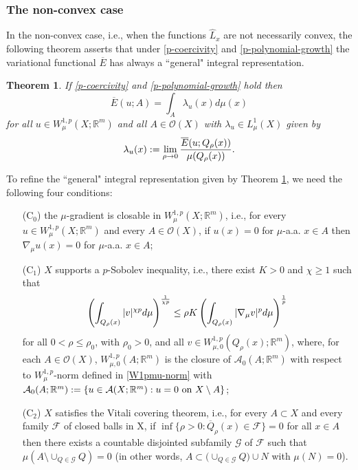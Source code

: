\documentclass[10pt]{amsart}
\numberwithin{equation}{section}
\newtheorem{theorem}{Theorem}[section]
\theoremstyle{definition}
\theoremstyle{remark}
\begin{document}
\subsubsection{The non-convex case} In the non-convex case, i.e., when the functions $\widehat{L}_x$ are not necessarily convex, the following theorem asserts that under \eqref{p-coercivity} and \eqref{p-polynomial-growth} the variational functional $\overline{E}$ has always a ``general" integral representation.

\begin{theorem}\label{N-C-IRT}
If \eqref{p-coercivity} and \eqref{p-polynomial-growth} hold then  
$$
\overline{E}(u;A)=\int_A \lambda_u(x)d\mu(x)
$$
for all $u\in W^{1,p}_\mu(X;{{\mathbb R}}^m)$ and all $A\in\mathcal{O}(X)$ with $\lambda_u\in L^1_\mu(X)$ given by 
$$
\lambda_u(x):=\lim_{\rho\to0}{\overline{E}(u;Q_\rho(x))\over\mu(Q_\rho(x))}.
$$ 
\end{theorem}

To refine the ``general" integral representation given by Theorem \ref{N-C-IRT}, we need the following four conditions:
\begin{itemize}
\item[(C$_0$)] the $\mu$-gradient is closable in $W^{1,p}_\mu(X;{{\mathbb R}}^m)$, i.e., for every $u\in W^{1,p}_\mu(X;{{\mathbb R}}^m)$ and every $A\in\mathcal{O}(X)$, if $u(x)=0$ for $\mu$-a.a. $x\in A$ then $\nabla_\mu u(x)=0$ for $\mu$-a.a. $x\in A$;
\item[(C$_1$)] $X$ supports a $p$-Sobolev inequality, i.e., there exist $K>0$ and $\chi\geq 1$ such that
\begin{equation}\label{Poincare-Inequality}
\left(\int_{Q_\rho(x)}|v|^{\chi p}d\mu\right)^{1\over\chi p}\leq \rho K\left(\int_{Q_\rho(x)}|\nabla_\mu v|^pd\mu\right)^{1\over p}
\end{equation}
for all $0<\rho\leq \rho_0$, with $\rho_0>0$, and all $v\in W^{1,p}_{\mu,0}(Q_\rho(x);{{\mathbb R}}^m)$, where, for each $A\in\mathcal{O}(X)$, $W^{1,p}_{\mu,0}(A;{{\mathbb R}}^m)$ is the closure of $\mathcal{A}_0(A;{{\mathbb R}}^m)$ with respect to $W^{1,p}_\mu$-norm defined in \eqref{W1pmu-norm} with $\mathcal{A}_0(A;{{\mathbb R}}^m):=\{u\in\mathcal{A}(X;{{\mathbb R}}^m):u=0\hbox{ on }X\setminus A\}$;
\item[(C$_2$)] $X$ satisfies the Vitali covering theorem, i.e., for every $A\subset X$ and every family $\mathcal{F}$ of closed balls in X, if $\inf\{\rho>0:\overline{Q}_\rho(x)\in\mathcal{F}\}=0$ for all $x\in A$ then there exists a countable disjointed subfamily $\mathcal{G}$ of $\mathcal{F}$ such that $\mu(A\setminus \cup_{Q\in\mathcal{G}}Q)=0$ (in other words, $A\subset \big(\cup_{Q\in\mathcal{G}}Q\big)\cup N$ with $\mu(N)=0$).
\end{itemize}
\end{document}
